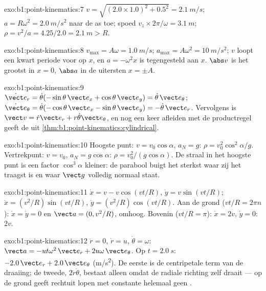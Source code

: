 \begin{solution}{exo:b1:point-kinematics:7}
$v = \sqrt{(2.0 \times 1.0)^2 + 0.5^2} = \qty{2.1}{m/s}$; $a = R\omega^2 =
\qty{2.0}{m/s^2}$ naar de as toe; spoed $v_z \times 2\pi/\omega =
\qty{3.1}{m}$; $\rho = v^2/a = 4.25/2.0 = \qty{2.1}{m} > R$.
\end{solution}

\begin{solution}{exo:b1:point-kinematics:8}
$v_{\max} = A\omega = \qty{1.0}{m/s}$; $a_{\max} = A\omega^2 = \qty{10}{m/s^2}$;
$v$ loopt een kwart periode voor op $x$, en $a = -\omega^2x$ is tegengesteld aan $x$.
$\abs v$ is het grootst in $x = 0$, $\abs a$ in de uitersten $x = \pm A$.
\end{solution}

\begin{solution}{exo:b1:point-kinematics:9}
$\dot{\vect e}_r = \dot\theta(-\sin\theta\,\vect e_x + \cos\theta\,\vect e_y)
= \dot\theta\,\vect e_\theta$; $\dot{\vect e}_\theta = \dot\theta(-\cos\theta\,
\vect e_x - \sin\theta\,\vect e_y) = -\dot\theta\,\vect e_r$. Vervolgens is
$\vect v = \dot r\vect e_r + r\dot\theta\vect e_\theta$, en nog een keer afleiden
met de productregel geeft de  uit
\cref{thm:b1:point-kinematics:cylindrical}.
\end{solution}

\begin{solution}{exo:b1:point-kinematics:10}
Hoogste punt: $v = v_0\cos\alpha$, $a_N = g$: $\rho = v_0^2\cos^2\alpha/g$.
Vertrekpunt: $v = v_0$, $a_N = g\cos\alpha$: $\rho = v_0^2/(g\cos\alpha)$.
De straal in het hoogste punt is een factor $\cos^3\alpha$ kleiner: de parabool buigt het sterkst
waar zij het traagst is en waar $\vect g$ volledig normaal staat.
\end{solution}

\begin{solution}{exo:b1:point-kinematics:11}
$\dot x = v - v\cos(vt/R)$, $\dot y = v\sin(vt/R)$; $\ddot x = (v^2/R)
\sin(vt/R)$, $\ddot y = (v^2/R)\cos(vt/R)$. Aan de grond ($vt/R = 2\pi n$):
$\dot x = \dot y = 0$ en $\vect a = (0, v^2/R)$, omhoog. Bovenin
($vt/R = \pi$): $\dot x = 2v$, $\dot y = 0$:  $2v$.
\end{solution}

\begin{solution}{exo:b1:point-kinematics:12}
$\ddot r = 0$, $\dot r = u$, $\dot\theta = \omega$: $\vect a = -ut\omega^2\,
\vect e_r + 2u\omega\,\vect e_\theta$. Op $t = \qty{2.0}{s}$: $-2.0\,\vect e_r
+ 2.0\,\vect e_\theta$ (\unit{m/s^2}). De eerste is de centripetale term
van de draaiing; de tweede, $2\dot r\dot\theta$, bestaat alleen omdat de
radiale richting zelf draait --- op de grond geeft rechtuit lopen met
constante  helemaal geen .
\end{solution}

